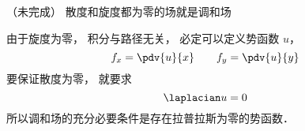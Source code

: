 
\begin{issues}
\issueDraft
\end{issues}

（未完成）
散度和旋度都为零的场就是调和场

由于旋度为零， 积分与路径无关， 必定可以定义势函数 $u$， 
\begin{equation}
f_x = \pdv{u}{x} \qquad f_y = \pdv{u}{y}
\end{equation}
要保证散度为零， 就要求
\begin{equation}
\laplacian u = 0
\end{equation}
所以调和场的充分必要条件是存在拉普拉斯为零的势函数．
